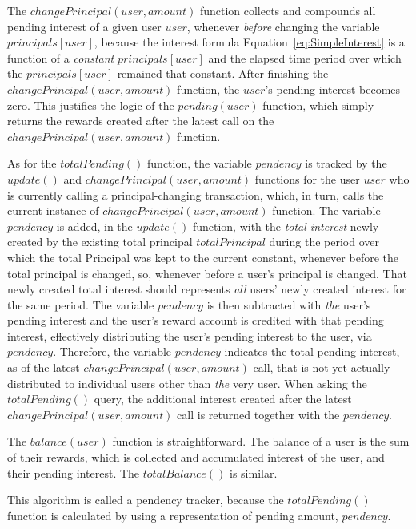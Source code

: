 \documentclass{article}
\begin{document}
The $changePrincipal(user, amount)$ function collects and compounds all pending
interest of a given user $user$, 
whenever \textit{before} changing the variable $principals[user]$, 
because the interest formula Equation~\ref{eq:SimpleInterest} is a function 
of a \textit{constant} $principals[user]$ 
and the elapsed time period over which the $principals[user]$ 
remained that constant.
After finishing the $changePrincipal(user, amount)$ function, 
the $user$'s pending interest becomes zero. 
This justifies the logic of the 
$pending(user)$ function, which simply returns the rewards created after the 
latest call on the $changePrincipal(user, amount)$ function.

As for the $totalPending()$ function, the variable $pendency$ is tracked by 
the $update()$ and $changePrincipal(user, amount)$ functions for the user 
$user$ who is currently calling a principal-changing transaction, which, in 
turn, calls the current instance of $changePrincipal(user, amount)$ 
function.
The variable $pendency$ is added, in the $update()$ function, 
with the \textit{total interest} newly created 
by the existing total principal $totalPrincipal$ during the period over which 
the total Principal was kept to the current constant, whenever before the total 
principal is changed, so, whenever before a user's principal is changed.
That newly created total interest should represents \textit{all} users' newly 
created interest for the same period.
The variable $pendency$ is then subtracted with \textit{the} user's pending 
interest and the user's reward account is credited with that pending interest, 
effectively distributing the user's pending interest to the user, via $pendency$.
Therefore, the variable $pendency$ indicates the total pending 
interest, as of the latest $changePrincipal(user, amount)$ call, that is not yet 
actually distributed to individual users other than \textit{the} very user.
When asking the $totalPending()$ query, the additional interest created 
after the latest $changePrincipal(user, amount)$ call is returned together with 
the $pendency$.

The $balance(user)$ function is straightforward. The balance of a user is 
the sum of their rewards, which is collected and accumulated interest of the 
user, and their pending interest. The $totalBalance()$ is similar.

This algorithm is called a pendency tracker, because the $totalPending()$ 
function is calculated by using a representation of pending amount, $pendency$.
\end{document}
